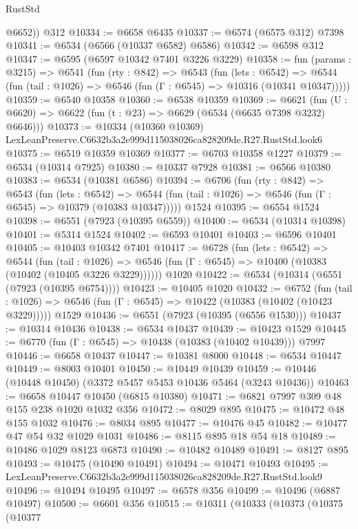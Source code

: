 \begin{lexlean}{RustStd}
\begin{coremodule}
        @6652))
    @312
@10334 := @6658 @6435
@10337 := @6574 (@6575 @312) @7398
@10341 := @6534 (@6566 (@10337 @6582) @6586)
@10342 := @6598 @312
@10347 := @6595 (@6597 @10342 @7401 @3226 @3229)
@10358 := fun (params : @3215) =>
  @6541
    (fun (rty : @842) =>
    @6543
      (fun (lets : @6542) =>
      @6544 (fun (tail : @1026) => @6546 (fun (Γ : @6545) => @10316 (@10341 @10347)))))
@10359 := @6540 @10358
@10360 := @6538 @10359
@10369 := @6621
    (fun (U : @6620) => @6622 (fun (t : @23) => @6629 (@6534 (@6635 @7398 @3232) @6646)))
@10373 := @10334 (@10360 @10369) LexLeanPreserve.C6632b3a2e999d115038026ca828209de.R27.RustStd.look6
@10375 := @6519 @10359 @10369
@10377 := @6703 @10358 @1227
@10379 := @6534 (@10314 @7925)
@10380 := @10337 @7928
@10381 := @6566 @10380
@10383 := @6534 (@10381 @6586)
@10394 := @6706
    (fun (rty : @842) =>
    @6543
      (fun (lets : @6542) =>
      @6544 (fun (tail : @1026) => @6546 (fun (Γ : @6545) => @10379 (@10383 @10347)))))
    @1524
@10395 := @6554 @1524
@10398 := @6551 (@7923 (@10395 @6559))
@10400 := @6534 (@10314 @10398)
@10401 := @5314 @1524
@10402 := @6593 @10401
@10403 := @6596 @10401
@10405 := @10403 @10342 @7401
@10417 := @6728
    (fun (lets : @6542) =>
    @6544
      (fun (tail : @1026) =>
      @6546 (fun (Γ : @6545) => @10400 (@10383 (@10402 (@10405 @3226 @3229))))))
    @1020
@10422 := @6534 (@10314 (@6551 (@7923 (@10395 @6754))))
@10423 := @10405 @1020
@10432 := @6752
    (fun (tail : @1026) => @6546 (fun (Γ : @6545) => @10422 (@10383 (@10402 (@10423 @3229)))))
    @1529
@10436 := @6551 (@7923 (@10395 (@6556 @1530)))
@10437 := @10314 @10436
@10438 := @6534 @10437
@10439 := @10423 @1529
@10445 := @6770 (fun (Γ : @6545) => @10438 (@10383 (@10402 @10439))) @7997
@10446 := @6658 @10437
@10447 := @10381 @8000
@10448 := @6534 @10447
@10449 := @8003 @10401
@10450 := @10449 @10439
@10459 := @10446 (@10448 @10450) (@3372 @5457 @5453 @10436 @5464 (@3243 @10436))
@10463 := @6658 @10447 @10450 (@6815 @10380)
@10471 := @6821 @7997 @309 @48 @155 @238 @1020 @1032 @356
@10472 := @8029 @895
@10475 := @10472 @48 @155 @1032
@10476 := @8034 @895
@10477 := @10476 @45
@10482 := @10477 @47 @54 @32 @1029 @1031
@10486 := @8115 @895 @18 @54 @18
@10489 := @10486 @1029 @8123 @6873
@10490 := @10482 @10489
@10491 := @8127 @895
@10493 := @10475 (@10490 @10491)
@10494 := @10471 @10493
@10495 := LexLeanPreserve.C6632b3a2e999d115038026ca828209de.R27.RustStd.look9
@10496 := @10494 @10495
@10497 := @6578 @356
@10499 := @10496 (@6887 @10497)
@10500 := @6601 @356
@10515 := @10311
    (@10333
      (@10373
        (@10375
          (@10377

\end{coremodule}
\end{lexlean}
